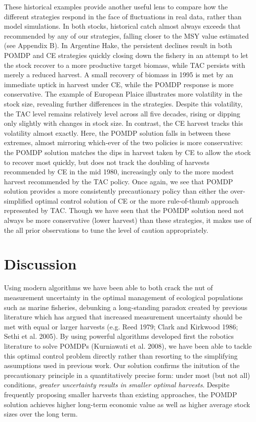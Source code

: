 \documentclass[3p]{elsarticle} %
\begin{document}
These historical examples provide another useful lens to compare how the
different strategies respond in the face of fluctuations in real data,
rather than model simulations. In both stocks, historical catch almost
always exceeds that recommended by any of our strategies, falling closer
to the MSY value estimated (see Appendix B). In Argentine Hake, the
persistent declines result in both POMDP and CE strategies quickly
closing down the fishery in an attempt to let the stock recover to a
more productive target biomass, while TAC persists with merely a reduced
harvest. A small recovery of biomass in 1995 is met by an immediate
uptick in harvest under CE, while the POMDP response is more
conservative. The example of European Plaice illustrates more volatility
in the stock size, revealing further differences in the strategies.
Despite this volatility, the TAC level remains relatively level across
all five decades, rising or dipping only slightly with changes in stock
size. In contrast, the CE harvest tracks this volatility almost exactly.
Here, the POMDP solution falls in between these extremes, almost
mirroring which-ever of the two policies is more conservative: the POMDP
solution matches the dips in harvest taken by CE to allow the stock to
recover most quickly, but does not track the doubling of harvests
recommended by CE in the mid 1980, increasingly only to the more modest
harvest recommended by the TAC policy. Once again, we see that POMDP
solution provides a more consistently precautionary policy than either
the over-simplified optimal control solution of CE or the more
rule-of-thumb approach represented by TAC. Though we have seen that the
POMDP solution need not always be more conservative (lower harvest) than
these strategies, it makes use of the all prior observations to tune the
level of caution appropriately.

\hypertarget{discussion}{%
\section{Discussion}\label{discussion}}

Using modern algorithms we have been able to both crack the nut of
measurement uncertainty in the optimal management of ecological
populations such as marine fisheries, debunking a long-standing paradox
created by previous literature which has argued that increased
measurement uncertainty should be met with equal or larger harvests
(e.g. Reed 1979; Clark and Kirkwood 1986; Sethi et al. 2005). By using
powerful algorithms developed first the robotics literature to solve
POMDPs (Kurniawati et al. 2008), we have been able to tackle this
optimal control problem directly rather than resorting to the
simplifying assumptions used in previous work. Our solution confirms the
initution of the precautionary principle in a quantitatively precise
form: under most (but not all) conditions, \emph{greater uncertainty
results in smaller optimal harvests}. Despite frequently proposing
smaller harvests than existing approaches, the POMDP solution achieves
higher long-term economic value as well as higher average stock sizes
over the long term.
\end{document}
